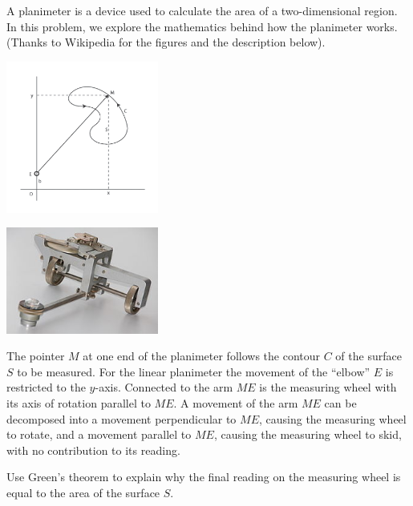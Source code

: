 \documentclass[svgnames]{watsonbook}
\begin{document}
\begin{aexercise}
  A planimeter is a device used to calculate the area of a
  two-dimensional region. In this problem, we explore the mathematics
  behind how the planimeter works. (Thanks to Wikipedia for the
  figures and the description below).

  \begin{center}
    \begin{minipage}{5cm}
      \includegraphics[width=5cm]{exercisefigures/planfig}
    \end{minipage}
    \begin{minipage}{5cm}
      \includegraphics[width=5cm]{exercisefigures/planimeter.jpg}
    \end{minipage}
  \end{center}

  The pointer $M$ at one end of the planimeter follows the contour $C$
  of the surface $S$ to be measured. For the linear planimeter the
  movement of the ``elbow'' $E$ is restricted to the
  $y$-axis. Connected to the arm $ME$ is the measuring wheel with its
  axis of rotation parallel to $ME$. A movement of the arm $ME$ can be
  decomposed into a movement perpendicular to $ME$, causing the
  measuring wheel to rotate, and a movement parallel to $ME$, causing
  the measuring wheel to skid, with no contribution to its reading.

  Use Green's theorem to explain why the final reading on the
  measuring wheel is equal to the area of the surface $S$.
\end{aexercise}

\end{document}
